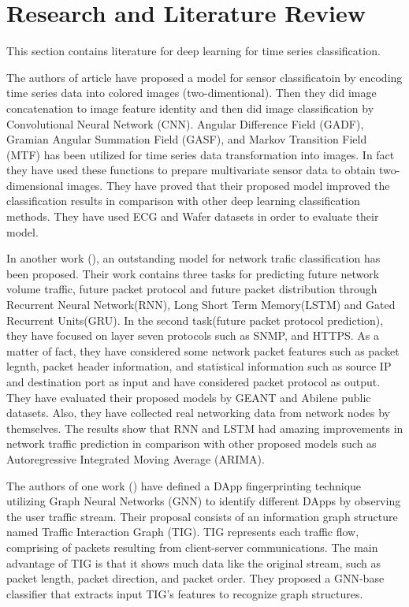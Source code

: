 \documentclass[conference]{IEEEtran}
\begin{document}
\section{Research and Literature Review}
This section contains literature for deep learning for time series classification. 

The authors of article \cite{b8} have proposed a model for sensor classificatoin by encoding time series data into colored images (two-dimentional). Then they did image concatenation to image feature identity and then did image classification by Convolutional Neural Network (CNN). Angular Difference Field (GADF), Gramian Angular Summation Field (GASF),  and Markov Transition Field (MTF) has been utilized for time series data transformation into images. In fact they have used these functions to prepare multivariate sensor data to obtain two-dimensional images. They have proved that their proposed model improved the classification results in comparison with other deep learning classification methods. They have used ECG and Wafer datasets in order to evaluate their model. 
\par In another work (\cite{ramakrishnan2018network}),  an outstanding model for network trafic classification has been proposed. Their work contains three tasks for predicting future network volume traffic, future packet protocol and future packet distribution through Recurrent Neural Network(RNN), Long Short Term Memory(LSTM) and Gated Recurrent Units(GRU). In the second task(future packet protocol prediction), they have focused on layer seven protocols such as SNMP, and HTTPS. As a matter of fact, they have considered some network packet features such as packet legnth, packet header information, and statistical information such as source IP and destination port as input and have considered packet protocol as output. They have evaluated their proposed models by GEANT and Abilene public datasets. Also, they have collected real networking data from network nodes by themselves. The results show that RNN and LSTM had amazing improvements in network traffic prediction in comparison with other proposed models such as Autoregressive Integrated Moving Average (ARIMA).  

\par The authors of one work (\cite{shen2021accurate}) have defined a DApp fingerprinting technique utilizing Graph Neural Networks (GNN) to identify different DApps by observing the user traffic stream. Their proposal consists of an information graph structure named Traffic Interaction Graph (TIG). TIG represents each traffic flow, comprising of packets resulting from client-server communications.  The main advantage of TIG is that it shows much data like the original stream, such as packet length, packet direction, and packet order. They proposed a GNN-base classifier that extracts input TIG's features to recognize graph structures.
\end{document}
